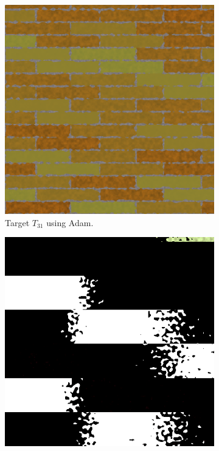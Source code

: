 \begin{figure}[h]
\centering
\begin{subfigure}[t]{.25\textwidth}
    \centering
    \includegraphics[width=\linewidth]{img/evaluation/M3/2 param/Neural_Adam_2_param.png}
    \caption{Target $T_{31}$ using Adam.}
    \label{fig:M3NeuralFinalRendersTwoParamAdam}
\end{subfigure}\hspace{0.7cm}
\begin{subfigure}[t]{.25\textwidth}
    \centering
    \includegraphics[width=\linewidth]{img/evaluation/M3/random/Neural_Adam_random_final.png}

\end{subfigure}
\end{figure}

